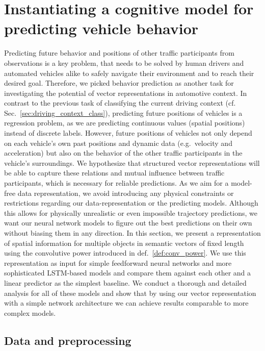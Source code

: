 \chapter{Instantiating a cognitive model for predicting vehicle behavior}
\label{chap:behav_pred}

Predicting future behavior and positions of other traffic participants from observations is a key problem, that needs to be solved by human drivers and automated vehicles alike to safely navigate their environment and to reach their desired goal.
Therefore, we picked behavior prediction as another task for investigating the potential of vector representations in automotive context.
In contrast to the previous task of classifying the current driving context (cf. Sec.~\ref{sec:driving_context_class}), predicting future positions of vehicles is a regression problem, as we are predicting continuous values (spatial positions) instead of discrete labels.
However, future positions of vehicles not only depend on each vehicle's own past positions and dynamic data (e.g.\ velocity and acceleration) but also on the behavior of the other traffic participants in the vehicle's surroundings.
We hypothesize that structured vector representations will be able to capture these relations and mutual influence between traffic participants, which is necessary for reliable predictions.
As we aim for a model-free data representation, we avoid introducing any physical constraints or restrictions regarding our data-representation or the predicting models.
Although this allows for physically unrealistic or even impossible trajectory predictions, we want our neural network models to figure out the best predictions on their own without biasing them in any direction.
In this section, we present a representation of spatial information for multiple objects in semantic vectors of fixed length using the convolutive power introduced in def.~\ref{def:conv_power}. 
We use this representation as input for simple feedforward neural networks and more sophisticated \ac{LSTM}-based models and compare them against each other and a linear predictor as the simplest baseline.
We conduct a thorough and detailed analysis for all of these models and show that by using our vector representation with a simple network architecture we can achieve results comparable to more complex models.

\section{Data and preprocessing}
\label{sec:data_preproc}

